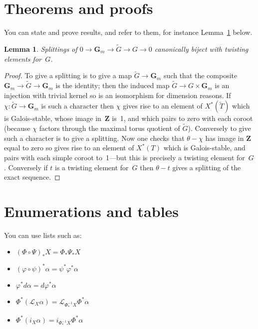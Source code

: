 \documentclass{article}
\newtheorem{lemma}[theorem]{Lemma}
\newcommand{\Z}{\mathbf{Z}}
\newcommand{\Gm}{\mathbf{G}_m}
\newcommand{\Gtilde}{{\tilde{G}}}
\newcommand{\Ttilde}{{\tilde{T}}}
\begin{document}
\section{Theorems and proofs}

You can state and prove results, and refer to them, for instance
Lemma~\ref{lem:splittings} below.

\begin{lemma}
\label{lem:splittings}
Splittings of $0\to\Gm\to\tilde{G}\to G\to 0$ canonically
biject with twisting elements for~$G$.
\end{lemma}

\begin{proof}
To give a splitting is to give a map $\tilde{G}\to\Gm$
such that the composite $\Gm\to\Gtilde\to\Gm$ is the identity;
then the induced map $\Gtilde\to G\times\Gm$ is an injection
with trivial kernel so is an isomorphism for dimension reasons.
If $\chi:\Gtilde\to\Gm$ is such a character then $\chi$ gives
rise to an element of $X^*(\Ttilde)$ which is Galois-stable,
whose image in~$\Z$ is~1, and which pairs to zero with each coroot
(because $\chi$ factors through the maximal torus quotient of $\Gtilde$).
Conversely to give such a character is to give a splitting.
Now one checks that $\theta-\chi$ has image in $\Z$ equal to zero
so gives rise to an element of $X^*(T)$ which is Galois-stable,
and pairs with each simple coroot to~1---but this is precisely
a twisting element for~$G$. Conversely if $t$ is a twisting element
for~$G$ then $\theta-t$ gives a splitting of the exact sequence.
\end{proof}

\section{Enumerations and tables}

You can use lists such as:

\begin{itemize}
  \item $(\Phi\circ \Psi)_*X=\Phi_*\Psi_*X$
  \item $(\varphi\circ \psi)^*\alpha=\psi^*\varphi^*\alpha$
  \item $\varphi^*d\alpha=d\varphi^*\alpha$
  \item $\Phi^*(\mathcal{L}_X\alpha)=\mathcal{L}_{\Phi^{-1}_*X}\Phi^*\alpha$
  \item $\Phi^*(i_X\alpha)=i_{\Phi^{-1}_*X}\Phi^*\alpha$
\end{itemize}
\end{document}
